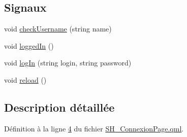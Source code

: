 \subsection*{Signaux}
\begin{DoxyCompactItemize}
\item 
void \hyperlink{classSH__ConnexionPage_a3d6fc8c024e382ed18d1af79ce6c3ca9}{check\-Username} (string name)
\item 
void \hyperlink{classSH__ConnexionPage_a0fcb9a27a635a132af3dae8ea5f27940}{logged\-In} ()
\item 
void \hyperlink{classSH__ConnexionPage_a0d05690176da749882ac537a008f889f}{log\-In} (string login, string password)
\item 
void \hyperlink{classSH__ConnexionPage_a0ae2e9c969961ef79b8a4e3153cc53e0}{reload} ()
\end{DoxyCompactItemize}


\subsection{Description détaillée}


Définition à la ligne \hyperlink{SH__ConnexionPage_8qml_source_l00004}{4} du fichier \hyperlink{SH__ConnexionPage_8qml_source}{S\-H\-\_\-\-Connexion\-Page.\-qml}.



